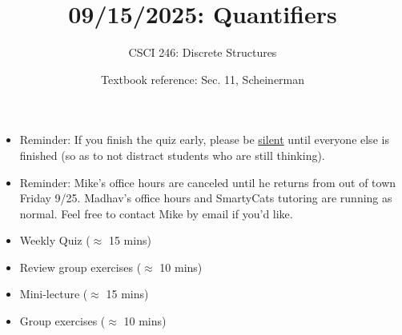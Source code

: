 \documentclass[10pt]{beamer}
\begin{document}






\title{09/15/2025: Quantifiers}
\author{CSCI 246: Discrete Structures}
\date{Textbook reference: Sec. 11, Scheinerman}

\begin{frame}
    \titlepage 
\end{frame}


\begin{frame}

\begin{myredbox}[title=Announcements]
\begin{itemize}
	\item Reminder: If you finish the quiz early, please be \underline{silent} until everyone else is finished (so as to not distract students who are still thinking).
	\item Reminder: Mike's office hours are canceled until he returns from out of town Friday 9/25.  Madhav's office hours and SmartyCats tutoring are running as normal. Feel free to contact Mike by email if you'd like.  
\end{itemize}

\end{myredbox}
\vfill 




\begin{myyellowbox}[title=Today's Agenda]
\begin{itemize}
	\item Weekly Quiz ($\approx$ 15 mins)
	\item Review group exercises ($\approx$ 10 mins)
	\item Mini-lecture ($\approx$ 15 mins)
	\item Group exercises ($\approx$ 10 mins)
\end{itemize}

\end{myyellowbox}
\vfill 

\end{frame}
\end{document}
